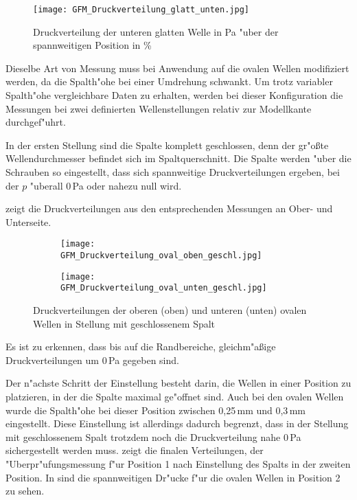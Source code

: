 \begin{figure}[h]
	\centering
	\texttt{[image: GFM\_Druckverteilung\_glatt\_unten.jpg]}
	\caption{Druckverteilung der unteren glatten Welle in Pa "uber der spannweitigen Position in \%}
	\label{fig:Druckverteilung_glatt_unten}
\end{figure}

Dieselbe Art von Messung muss bei Anwendung auf die ovalen Wellen modifiziert werden, da die Spalth"ohe bei einer Umdrehung schwankt.
Um trotz variabler Spalth"ohe vergleichbare Daten zu erhalten, werden bei dieser Konfiguration die Messungen bei zwei definierten Wellenstellungen relativ zur Modellkante durchgef"uhrt.

In der ersten Stellung sind die Spalte komplett geschlossen, denn der gr"o\ss{}te Wellendurchmesser befindet sich im Spaltquerschnitt.
Die Spalte werden "uber die Schrauben so eingestellt, dass sich spannweitige Druckverteilungen ergeben, bei der $p$ "uberall 0\,Pa oder nahezu null wird.

 zeigt die Druckverteilungen aus den entsprechenden Messungen an Ober- und Unterseite.

\begin{figure}[h]
	\centering
	\begin{subfigure}[c]{0.85\textwidth}		
		\texttt{[image: GFM\_Druckverteilung\_oval\_oben\_geschl.jpg]}
	\end{subfigure}
	\begin{subfigure}[c]{0.85\textwidth}
		\texttt{[image: GFM\_Druckverteilung\_oval\_unten\_geschl.jpg]}
	\end{subfigure}
	\caption{Druckverteilungen der oberen (oben) und unteren (unten) ovalen Wellen in Stellung mit geschlossenem Spalt}
	\label{fig:Druckverteilung_oval_geschl}
\end{figure}

Es ist zu erkennen, dass bis auf die Randbereiche, gleichm"a\ss{}ige Druckverteilungen um 0\,Pa gegeben sind.

Der n"achste Schritt der Einstellung besteht darin, die Wellen in einer Position zu platzieren, in der die Spalte maximal ge"offnet sind. Auch bei den ovalen Wellen wurde die Spalth"ohe bei dieser Position zwischen 0,25\,mm und 0,3\,mm eingestellt. Diese Einstellung ist allerdings dadurch begrenzt, dass in der Stellung mit geschlossenem Spalt trotzdem noch die Druckverteilung nahe 0\,Pa sichergestellt werden muss.  zeigt die finalen Verteilungen, der "Uberpr"ufungsmessung f"ur Position 1 nach Einstellung des Spalts in der zweiten Position.  
In  sind die spannweitigen Dr"ucke f"ur die ovalen Wellen in Position 2 zu sehen.

